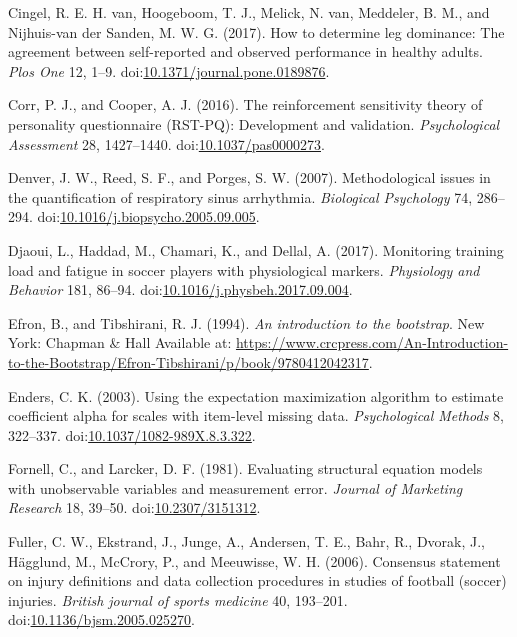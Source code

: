 \documentclass[utf8]{frontiersHLTH}
\begin{document}
\leavevmode\hypertarget{ref-VanCingel2017}{}%
Cingel, R. E. H. van, Hoogeboom, T. J., Melick, N. van, Meddeler, B. M.,
and Nijhuis-van der Sanden, M. W. G. (2017). How to determine leg
dominance: The agreement between self-reported and observed performance
in healthy adults. \emph{Plos One} 12, 1--9.
doi:\href{https://doi.org/10.1371/journal.pone.0189876}{10.1371/journal.pone.0189876}.

\leavevmode\hypertarget{ref-Corr2016c}{}%
Corr, P. J., and Cooper, A. J. (2016). The reinforcement sensitivity
theory of personality questionnaire (RST-PQ): Development and
validation. \emph{Psychological Assessment} 28, 1427--1440.
doi:\href{https://doi.org/10.1037/pas0000273}{10.1037/pas0000273}.

\leavevmode\hypertarget{ref-Denver2007}{}%
Denver, J. W., Reed, S. F., and Porges, S. W. (2007). Methodological
issues in the quantification of respiratory sinus arrhythmia.
\emph{Biological Psychology} 74, 286--294.
doi:\href{https://doi.org/10.1016/j.biopsycho.2005.09.005}{10.1016/j.biopsycho.2005.09.005}.

\leavevmode\hypertarget{ref-Djaoui2017}{}%
Djaoui, L., Haddad, M., Chamari, K., and Dellal, A. (2017). Monitoring
training load and fatigue in soccer players with physiological markers.
\emph{Physiology and Behavior} 181, 86--94.
doi:\href{https://doi.org/10.1016/j.physbeh.2017.09.004}{10.1016/j.physbeh.2017.09.004}.

\leavevmode\hypertarget{ref-Efron1993}{}%
Efron, B., and Tibshirani, R. J. (1994). \emph{An introduction to the
bootstrap}. New York: Chapman \& Hall Available at:
\url{https://www.crcpress.com/An-Introduction-to-the-Bootstrap/Efron-Tibshirani/p/book/9780412042317}.

\leavevmode\hypertarget{ref-Enders2003}{}%
Enders, C. K. (2003). Using the expectation maximization algorithm to
estimate coefficient alpha for scales with item-level missing data.
\emph{Psychological Methods} 8, 322--337.
doi:\href{https://doi.org/10.1037/1082-989X.8.3.322}{10.1037/1082-989X.8.3.322}.

\leavevmode\hypertarget{ref-Fornell1981}{}%
Fornell, C., and Larcker, D. F. (1981). Evaluating structural equation
models with unobservable variables and measurement error. \emph{Journal
of Marketing Research} 18, 39--50.
doi:\href{https://doi.org/10.2307/3151312}{10.2307/3151312}.

\leavevmode\hypertarget{ref-Fuller2006}{}%
Fuller, C. W., Ekstrand, J., Junge, A., Andersen, T. E., Bahr, R.,
Dvorak, J., Hägglund, M., McCrory, P., and Meeuwisse, W. H. (2006).
Consensus statement on injury definitions and data collection procedures
in studies of football (soccer) injuries. \emph{British journal of
sports medicine} 40, 193--201.
doi:\href{https://doi.org/10.1136/bjsm.2005.025270}{10.1136/bjsm.2005.025270}.
\end{document}
